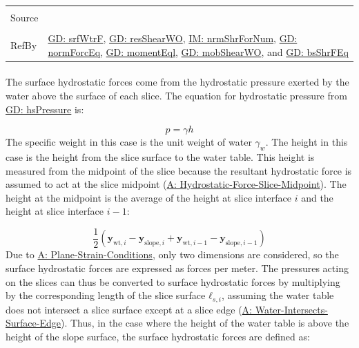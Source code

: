 \documentclass[12pt]{article}
\begin{document}
\begin{minipage}{\textwidth}
\begin{tabular}{>{\raggedright}p{}>{\raggedright\arraybackslash}p{}}
\\ \midrule \\
Source & \cite{fredlund1977}
         
\\ \midrule \\
RefBy & \hyperref[GD:srfWtrF]{GD: srfWtrF}, \hyperref[GD:resShearWO]{GD: resShearWO}, \hyperref[IM:nrmShrForNum]{IM: nrmShrForNum}, \hyperref[GD:normForcEq]{GD: normForcEq}, \hyperref[GD:momentEql]{GD: momentEql}, \hyperref[GD:mobShearWO]{GD: mobShearWO}, and \hyperref[GD:bsShrFEq]{GD: bsShrFEq}
        
\\ \bottomrule
\end{tabular}
\end{minipage}
\paragraph{}
\label{GD:srfWtrFDeriv}
The surface hydrostatic forces come from the hydrostatic pressure exerted by the water above the surface of each slice. The equation for hydrostatic pressure from \hyperref[GD:hsPressure]{GD: hsPressure} is:

\begin{displaymath}
p=γ h
\end{displaymath}
The specific weight in this case is the unit weight of water ${γ_{w}}$. The height in this case is the height from the slice surface to the water table. This height is measured from the midpoint of the slice because the resultant hydrostatic force is assumed to act at the slice midpoint (\hyperref[assumpHFSM]{A: Hydrostatic-Force-Slice-Midpoint}). The height at the midpoint is the average of the height at slice interface $i$ and the height at slice interface $i-1$:

\begin{displaymath}
\frac{1}{2} \left({\mathbf{y}_{\text{wt},i}}-{\mathbf{y}_{\text{slope},i}}+{\mathbf{y}_{\text{wt},i-1}}-{\mathbf{y}_{\text{slope},i-1}}\right)
\end{displaymath}
Due to \hyperref[assumpPSC]{A: Plane-Strain-Conditions}, only two dimensions are considered, so the surface hydrostatic forces are expressed as forces per meter. The pressures acting on the slices can thus be converted to surface hydrostatic forces by multiplying by the corresponding length of the slice surface ${\mathbf{ℓ}_{s,i}}$, assuming the water table does not intersect a slice surface except at a slice edge (\hyperref[assumpWISE]{A: Water-Intersects-Surface-Edge}). Thus, in the case where the height of the water table is above the height of the slope surface, the surface hydrostatic forces are defined as:
\end{document}
